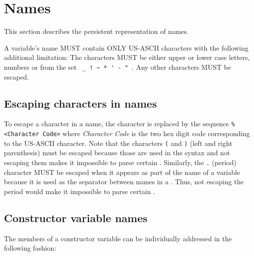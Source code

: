 \documentclass[justify]{nasa-ese}
\begin{document}
\section{Names}
\label{sec-names}

This section describes the persistent representation of names.

A \DAP variable's name MUST contain ONLY US-ASCII characters with the
following additional limitation: The characters MUST be either upper or lower
case letters, numbers or from the set \verb+ _ ! ~ * ' - " +. Any other
characters MUST be escaped.

\subsection{Escaping characters in names}

To escape a character in a name, the character is replaced by the sequence
\verb+%<Character Code>+ where \emph{Character Code} is the two
hex digit code corresponding to the US-ASCII character. Note that the
characters \verb+(+ and \verb+)+ (left and right parenthesis) must be escaped
because those are used in the \CE syntax and not escaping them makes it
impossible to parse certain \CEs. Similarly, the \verb+.+ (period) character
MUST be escaped when it appears as part of the name of a variable because it
is used as the separator between names in a \FQN. Thus, not escaping the
period would make it impossible to parse certain \CEs.

\subsection{Constructor variable names}

The members of a constructor variable can be individually addressed in the
following fashion:
\end{document}
